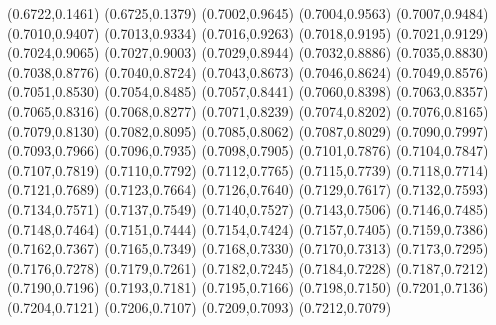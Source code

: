 \PST@Filltriangle(0.6722,0.1461)
\PST@Filltriangle(0.6725,0.1379)
\PST@Filltriangle(0.7002,0.9645)
\PST@Filltriangle(0.7004,0.9563)
\PST@Filltriangle(0.7007,0.9484)
\PST@Filltriangle(0.7010,0.9407)
\PST@Filltriangle(0.7013,0.9334)
\PST@Filltriangle(0.7016,0.9263)
\PST@Filltriangle(0.7018,0.9195)
\PST@Filltriangle(0.7021,0.9129)
\PST@Filltriangle(0.7024,0.9065)
\PST@Filltriangle(0.7027,0.9003)
\PST@Filltriangle(0.7029,0.8944)
\PST@Filltriangle(0.7032,0.8886)
\PST@Filltriangle(0.7035,0.8830)
\PST@Filltriangle(0.7038,0.8776)
\PST@Filltriangle(0.7040,0.8724)
\PST@Filltriangle(0.7043,0.8673)
\PST@Filltriangle(0.7046,0.8624)
\PST@Filltriangle(0.7049,0.8576)
\PST@Filltriangle(0.7051,0.8530)
\PST@Filltriangle(0.7054,0.8485)
\PST@Filltriangle(0.7057,0.8441)
\PST@Filltriangle(0.7060,0.8398)
\PST@Filltriangle(0.7063,0.8357)
\PST@Filltriangle(0.7065,0.8316)
\PST@Filltriangle(0.7068,0.8277)
\PST@Filltriangle(0.7071,0.8239)
\PST@Filltriangle(0.7074,0.8202)
\PST@Filltriangle(0.7076,0.8165)
\PST@Filltriangle(0.7079,0.8130)
\PST@Filltriangle(0.7082,0.8095)
\PST@Filltriangle(0.7085,0.8062)
\PST@Filltriangle(0.7087,0.8029)
\PST@Filltriangle(0.7090,0.7997)
\PST@Filltriangle(0.7093,0.7966)
\PST@Filltriangle(0.7096,0.7935)
\PST@Filltriangle(0.7098,0.7905)
\PST@Filltriangle(0.7101,0.7876)
\PST@Filltriangle(0.7104,0.7847)
\PST@Filltriangle(0.7107,0.7819)
\PST@Filltriangle(0.7110,0.7792)
\PST@Filltriangle(0.7112,0.7765)
\PST@Filltriangle(0.7115,0.7739)
\PST@Filltriangle(0.7118,0.7714)
\PST@Filltriangle(0.7121,0.7689)
\PST@Filltriangle(0.7123,0.7664)
\PST@Filltriangle(0.7126,0.7640)
\PST@Filltriangle(0.7129,0.7617)
\PST@Filltriangle(0.7132,0.7593)
\PST@Filltriangle(0.7134,0.7571)
\PST@Filltriangle(0.7137,0.7549)
\PST@Filltriangle(0.7140,0.7527)
\PST@Filltriangle(0.7143,0.7506)
\PST@Filltriangle(0.7146,0.7485)
\PST@Filltriangle(0.7148,0.7464)
\PST@Filltriangle(0.7151,0.7444)
\PST@Filltriangle(0.7154,0.7424)
\PST@Filltriangle(0.7157,0.7405)
\PST@Filltriangle(0.7159,0.7386)
\PST@Filltriangle(0.7162,0.7367)
\PST@Filltriangle(0.7165,0.7349)
\PST@Filltriangle(0.7168,0.7330)
\PST@Filltriangle(0.7170,0.7313)
\PST@Filltriangle(0.7173,0.7295)
\PST@Filltriangle(0.7176,0.7278)
\PST@Filltriangle(0.7179,0.7261)
\PST@Filltriangle(0.7182,0.7245)
\PST@Filltriangle(0.7184,0.7228)
\PST@Filltriangle(0.7187,0.7212)
\PST@Filltriangle(0.7190,0.7196)
\PST@Filltriangle(0.7193,0.7181)
\PST@Filltriangle(0.7195,0.7166)
\PST@Filltriangle(0.7198,0.7150)
\PST@Filltriangle(0.7201,0.7136)
\PST@Filltriangle(0.7204,0.7121)
\PST@Filltriangle(0.7206,0.7107)
\PST@Filltriangle(0.7209,0.7093)
\PST@Filltriangle(0.7212,0.7079)
